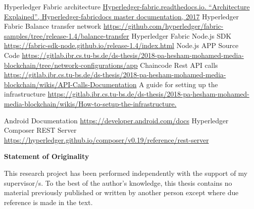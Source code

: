 \documentclass{report}
\begin{document}
\cleardoublepage
\listoffigures
\begin{thebibliography}{9}

Hyperledger Fabric architecture
\url{Hyperledger-fabric.readthedocs.io. “Architecture Explained”, Hyperledger-fabricdocs master documentation, 2017}
Hyperledger Fabric Balance transfer network 
\url{https://github.com/hyperledger/fabric-samples/tree/release-1.4/balance-transfer}
Hyperledger Fabric Node.js SDK
\url{https://fabric-sdk-node.github.io/release-1.4/index.html}
Node.js APP Source Code
\url{https://gitlab.ibr.cs.tu-bs.de/ds-thesis/2018-pa-hesham-mohamed-media-blockchain/tree/network-configurations/app}
Chaincode Rest API calls 
\url{https://gitlab.ibr.cs.tu-bs.de/ds-thesis/2018-pa-hesham-mohamed-media-blockchain/wikis/API-Calls-Documentation}
A guide for setting up the infrastructure
\url{https://gitlab.ibr.cs.tu-bs.de/ds-thesis/2018-pa-hesham-mohamed-media-blockchain/wikis/How-to-setup-the-infrastructure.}

Android Documentation
\url{https://developer.android.com/docs}
Hyperledger Composer REST Server
\url{https://hyperledger.github.io/composer/v0.19/reference/rest-server}



\appendix
\end{thebibliography}
\cleardoublepage
\centerline{\bfseries Statement of Originality}
	\vspace*{1em}
	\noindent
	This research project has been performed independently with the support of my supervisor/s.
	To the best of the author's knowledge, this thesis contains no material previously
	published or written by another person except where due reference is made in the text.
\end{document}
